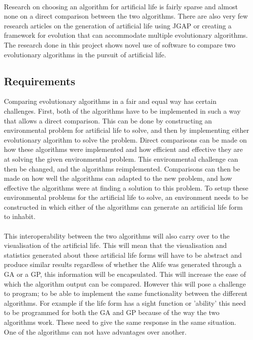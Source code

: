 \documentclass[12pt]{article}
\begin{document}
\paragraph{}
Research on choosing an algorithm for artificial life is fairly sparse and almost none on a direct comparison between the two algorithms. There are also
very few research articles on the generation of artificial life using JGAP or creating a framework for evolution that can accommodate multiple 
evolutionary algorithms. The research done in this project shows novel use of software to compare two evolutionary algorithms in the pursuit of
artificial life.

\subsection{Requirements}
Comparing evolutionary algorithms in a fair and equal way has certain challenges. First, both of the algorithms have to be implemented in such
a way that allows a direct comparison.  This can be done by constructing an environmental problem for artificial life to solve,
and then by implementing either evolutionary algorithm to solve the problem. Direct comparisons can be made on how these algorithms
were implemented and how efficient and effective they are at solving the given environmental problem. 
This environmental challenge can then be changed, and the algorithms reimplemented. Comparisons can then be made on how well the algorithms
can adapted to the new problem, and how effective the algorithms were at finding a solution to this problem.
To setup these environmental problems for the artificial life to solve, an environment needs to be constructed in which either of the 
algorithms can generate an artificial life form to inhabit.

\paragraph{}
This interoperability between the two algorithms will also carry over to the visualisation of the artificial life. This will mean
that the visualisation and statistics generated about these artificial life forms will have to be abstract and produce similar results regardless of
whether the Alife was generated through a GA or a GP, this information will be encapsulated. This will increase the ease of which the algorithm
output can be compared. However this will pose a challenge to program; to be able to implement the same functionality between the 
different algorithms. For example if the life form has a sight function or 'ability' this need to be programmed for both
the GA and GP because of the way the two algorithms work. These need to give the same response in the same situation. One of the
algorithms can not have advantages over another.
	
\end{document}
